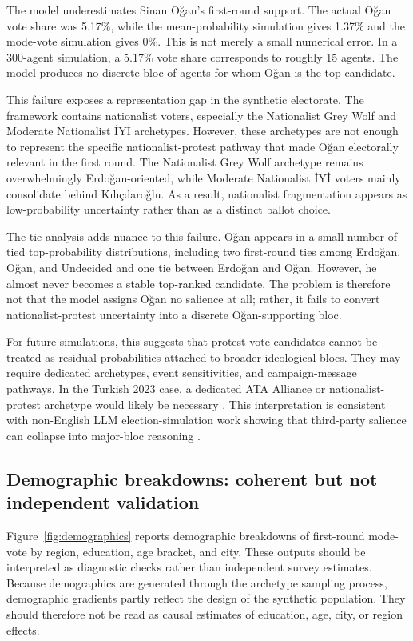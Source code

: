 \documentclass[pdflatex,sn-mathphys-num,iicol]{sn-jnl}
\begin{document}
The model underestimates Sinan Oğan's first-round support. The actual Oğan vote
share was 5.17\%, while the mean-probability simulation gives 1.37\% and the
mode-vote simulation gives 0\%. This is not merely a small numerical error. In
a 300-agent simulation, a 5.17\% vote share corresponds to roughly 15 agents.
The model produces no discrete bloc of agents for whom Oğan is the top
candidate.

This failure exposes a representation gap in the synthetic electorate. The
framework contains nationalist voters, especially the Nationalist Grey Wolf and
Moderate Nationalist İYİ archetypes. However, these archetypes are not enough
to represent the specific nationalist-protest pathway that made Oğan electorally
relevant in the first round. The Nationalist Grey Wolf archetype remains
overwhelmingly Erdoğan-oriented, while Moderate Nationalist İYİ voters mainly
consolidate behind Kılıçdaroğlu. As a result, nationalist fragmentation appears
as low-probability uncertainty rather than as a distinct ballot choice.

The tie analysis adds nuance to this failure. Oğan appears in a small number of
tied top-probability distributions, including two first-round ties among
Erdoğan, Oğan, and Undecided and one tie between Erdoğan and Oğan. However,
he almost never becomes a stable top-ranked candidate. The problem is therefore
not that the model assigns Oğan no salience at all; rather, it fails to convert
nationalist-protest uncertainty into a discrete Oğan-supporting bloc.

For future simulations, this suggests that protest-vote candidates cannot be
treated as residual probabilities attached to broader ideological blocs. They
may require dedicated archetypes, event sensitivities, and campaign-message
pathways. In the Turkish 2023 case, a dedicated ATA Alliance or
nationalist-protest archetype would likely be necessary
\cite{gerim2025victory,karaca2024socialmedia}. This interpretation is consistent
with non-English LLM election-simulation work showing that third-party salience
can collapse into major-bloc reasoning \cite{kang2026dynamok}.

\subsection{Demographic breakdowns: coherent but not independent
validation}\label{subsec:demographic}

Figure~\ref{fig:demographics} reports demographic breakdowns of first-round
mode-vote by region, education, age bracket, and city. These outputs should be
interpreted as diagnostic checks rather than independent survey estimates.
Because demographics are generated through the archetype sampling process,
demographic gradients partly reflect the design of the synthetic population.
They should therefore not be read as causal estimates of education, age, city,
or region effects.
\end{document}
